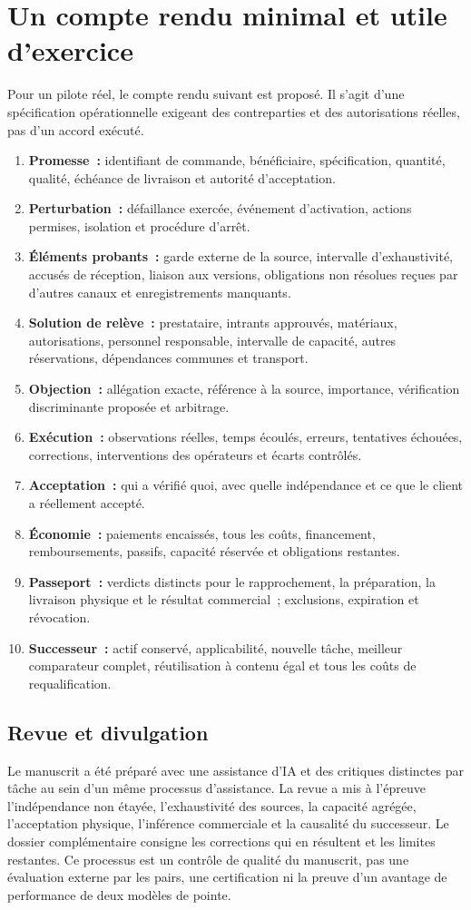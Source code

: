 \documentclass[11pt,a4paper]{article}
\begin{document}
\section{Un compte rendu minimal et utile d’exercice}\label{app:record}
Pour un pilote réel, le compte rendu suivant est proposé. Il s’agit d’une spécification opérationnelle exigeant des contreparties et des autorisations réelles, pas d’un accord exécuté.
\begin{enumerate}
\item \textbf{Promesse~:} identifiant de commande, bénéficiaire, spécification, quantité, qualité, échéance de livraison et autorité d’acceptation.
\item \textbf{Perturbation~:} défaillance exercée, événement d’activation, actions permises, isolation et procédure d’arrêt.
\item \textbf{Éléments probants~:} garde externe de la source, intervalle d’exhaustivité, accusés de réception, liaison aux versions, obligations non résolues reçues par d’autres canaux et enregistrements manquants.
\item \textbf{Solution de relève~:} prestataire, intrants approuvés, matériaux, autorisations, personnel responsable, intervalle de capacité, autres réservations, dépendances communes et transport.
\item \textbf{Objection~:} allégation exacte, référence à la source, importance, vérification discriminante proposée et arbitrage.
\item \textbf{Exécution~:} observations réelles, temps écoulés, erreurs, tentatives échouées, corrections, interventions des opérateurs et écarts contrôlés.
\item \textbf{Acceptation~:} qui a vérifié quoi, avec quelle indépendance et ce que le client a réellement accepté.
\item \textbf{Économie~:} paiements encaissés, tous les coûts, financement, remboursements, passifs, capacité réservée et obligations restantes.
\item \textbf{Passeport~:} verdicts distincts pour le rapprochement, la préparation, la livraison physique et le résultat commercial~; exclusions, expiration et révocation.
\item \textbf{Successeur~:} actif conservé, applicabilité, nouvelle tâche, meilleur comparateur complet, réutilisation à contenu égal et tous les coûts de requalification.
\end{enumerate}

\subsection*{Revue et divulgation}
Le manuscrit a été préparé avec une assistance d’IA et des critiques distinctes par tâche au sein d’un même processus d’assistance. La revue a mis à l’épreuve l’indépendance non étayée, l’exhaustivité des sources, la capacité agrégée, l’acceptation physique, l’inférence commerciale et la causalité du successeur. Le dossier complémentaire consigne les corrections qui en résultent et les limites restantes. Ce processus est un contrôle de qualité du manuscrit, pas une évaluation externe par les pairs, une certification ni la preuve d’un avantage de performance de deux modèles de pointe.
\end{document}
